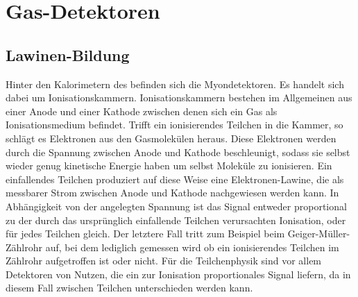 \section{Gas-Detektoren}
\subsection{Lawinen-Bildung}
Hinter den Kalorimetern des \atlas befinden sich die Myondetektoren. Es handelt sich dabei um Ionisationskammern. Ionisationskammern bestehen im Allgemeinen aus einer Anode und einer Kathode zwischen denen sich ein Gas als Ionisationsmedium befindet. Trifft ein ionisierendes Teilchen in die Kammer, so schlägt es Elektronen aus den Gasmolekülen heraus. Diese Elektronen werden durch die Spannung zwischen Anode und Kathode beschleunigt, sodass sie selbst wieder genug kinetische Energie haben um selbst Moleküle zu ionisieren. Ein einfallendes Teilchen produziert auf diese Weise eine Elektronen-Lawine, die als messbarer Strom zwischen Anode und Kathode nachgewiesen werden kann. In Abhängigkeit von der angelegten Spannung ist das Signal entweder proportional zu der durch das ursprünglich einfallende Teilchen verursachten Ionisation, oder für jedes Teilchen gleich. Der letztere Fall tritt zum Beispiel beim Geiger-Müller-Zählrohr auf, bei dem lediglich gemessen wird ob ein ionisierendes Teilchen im Zählrohr aufgetroffen ist oder nicht. Für die Teilchenphysik sind vor allem Detektoren von Nutzen, die ein zur Ionisation proportionales Signal liefern, da in diesem Fall zwischen Teilchen unterschieden werden kann.
